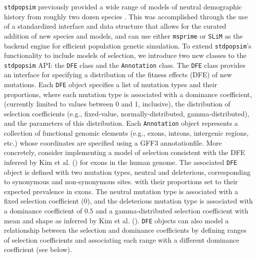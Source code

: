 \documentclass[hidelinks]{article}
\newcommand{\stdpopsim}{\texttt{stdpopsim}\xspace}
\newcommand{\slim}{\texttt{SLiM}\xspace}
\newcommand{\msprime}{\texttt{msprime}\xspace}
\begin{document}
    \stdpopsim previously provided a wide range of models of neutral
    demographic history from roughly two dozen species \citep{lauterbur2023expanding}.
    This was accomplished through the use of a standardized interface
    and data structure that allows for the curated addition of new
    species and models, and can use either
    \msprime \citep{Baumdicker2022} or \slim \citep{haller2019slim}
    as the backend engine for efficient population genetic simulation.
    To extend \stdpopsim's functionality to include models of selection, 
    we introduce two new classes
    to the \stdpopsim API: the \texttt{DFE} class and the \texttt{Annotation} class.
    The \texttt{DFE} class provides an interface for specifying
    a distribution of the fitness effects (DFE) of new mutations.
    Each \texttt{DFE} object specifies a list of mutation types and
    their proportions, where 
    each mutation type is associated with a dominance coefficient,
    (currently limited to values between 0 and 1, inclusive),
    the distribution of selection coefficients (e.g., fixed-value, normally-distributed, gamma-distributed),
    and the parameters of this distribution.
    Each \texttt{Annotation} object represents a collection of functional
    genomic elements (e.g., exons, introns, intergenic regions, etc.)
    whose coordinates are specified using a GFF3 annotationfile.      
    More concretely, consider implementing a model of selection consistent with the
    DFE inferred by Kim et al. (\citeyear{kim2017inference}) for exons in the human genome.
    The associated \texttt{DFE} object is defined with two mutation types,
    neutral and deleterious, corresponding to synonymous and non-synonymous sites.
    with their proportions set to their expected prevalence in exons. 
    The neutral mutation type is associated with a fixed selection coefficient (0),
    and the deleterious mutation type is associated with a dominance coefficient of $0.5$ and
    a gamma-distributed selection coefficient
    with mean and shape as inferred by Kim et al. (\citeyear{kim2017inference}).
    \texttt{DFE} objects can also model a relationship between the selection and dominance coefficients \citep{huber2018gene}
    by defining ranges of selection coefficients and associating each range with a different dominance coefficient (see below).
    
\end{document}
